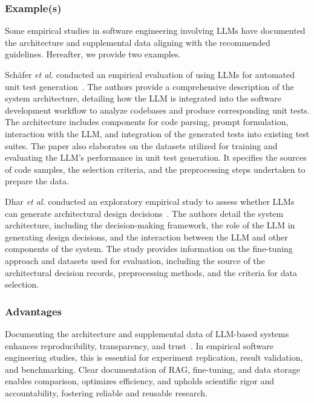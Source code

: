 \subsubsection{Example(s)}

Some empirical studies in software engineering involving LLMs have documented the architecture and supplemental data aligning with the recommended guidelines. Hereafter, we provide two examples.


Sch{\"{a}}fer \textit{et al.} conducted an empirical evaluation of using LLMs for automated unit test generation~\cite{DBLP:journals/tse/SchaferNET24}. The authors provide a comprehensive description of the system architecture, detailing how the LLM is integrated into the software development workflow to analyze codebases and produce corresponding unit tests. The architecture includes components for code parsing, prompt formulation, interaction with the LLM, and integration of the generated tests into existing test suites. The paper also elaborates on the datasets utilized for training and evaluating the LLM's performance in unit test generation. It specifies the sources of code samples, the selection criteria, and the preprocessing steps undertaken to prepare the data.

Dhar \textit{et al.} conducted an exploratory empirical study to assess whether LLMs can generate architectural design decisions~\cite{DBLP:conf/icsa/DharVV24}. The authors detail the system architecture, including the decision-making framework, the role of the LLM in generating design decisions, and the interaction between the LLM and other components of the system. The study provides information on the fine-tuning approach and datasets used for evaluation, including the source of the architectural decision records, preprocessing methods, and the criteria for data selection. 

\subsubsection{Advantages}

Documenting the architecture and supplemental data of LLM-based systems enhances reproducibility, transparency, and trust~\cite{DBLP:journals/software/LuZXXW24}. In empirical software engineering studies, this is essential for experiment replication, result validation, and benchmarking. Clear documentation of RAG, fine-tuning, and data storage enables comparison, optimizes efficiency, and upholds scientific rigor and accountability, fostering reliable and reusable research.

